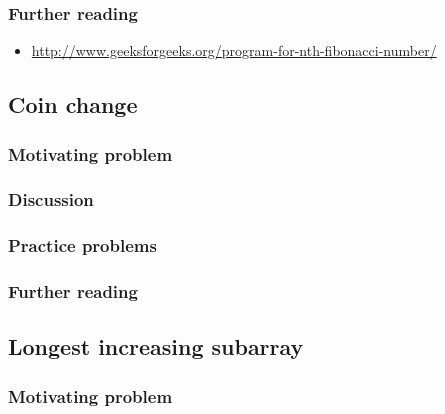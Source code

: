 \subsubsection*{Further reading}

\begin{itemize}
\item \url{http://www.geeksforgeeks.org/program-for-nth-fibonacci-number/}
\end{itemize}

\subsection{Coin change}

\subsubsection*{Motivating problem}







\subsubsection*{Discussion}

\subsubsection*{Practice problems}

\subsubsection*{Further reading}

\subsection{Longest increasing subarray}

\subsubsection*{Motivating problem}


